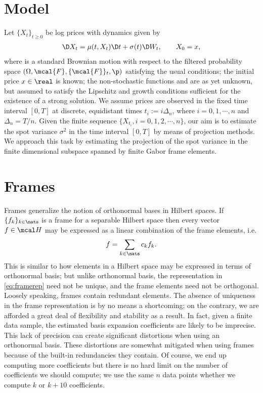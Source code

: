 \section{Model} \label{sec:model}
Let $\{X_t\}_{t\ge 0}$ be  log prices with dynamics given by  
\begin{align}
  \D X_t =   \mu(t, X_t) \D t + \sigma(t) \D W_t, \qquad X_0 = x,  
  \label{eq:pdynamics}
\end{align}
where \sbm is a standard Brownian motion with respect to the filtered probability space $(\Omega, \mcal{F}, \{\mcal{F}\}_t, \p)$ satisfying the usual conditions; the initial price $x \in \real$ is known; the non-stochastic functions \idp and \ivp are as yet unknown, but assumed to satisfy the Lipschitz and growth conditions sufficient for the existence of a strong solution. We assume prices are observed in the fixed time interval  $[0,T]$ at discrete, equidistant times $t_i := i\Delta_n$, where  $i= 0,1,\cdots,n$ and $\Delta_n = T/n$. Given the finite sequence  $\{X_{t_i}, i=0,1,2,\cdots,n\}$, our aim is to estimate the spot variance $\sigma^2$ in the time interval $[0,T]$ by means of projection methods. We approach this task  by estimating the projection  of the spot variance in  the finite dimensional subspace spanned by finite Gabor frame elements.  
\section{ Frames}\label{sec:gabor} 
Frames generalize the notion of orthonormal bases in  Hilbert spaces. If $\{f_k\}_{k \in \nats}$ is a frame for a separable Hilbert space \hs then every vector $f \in \hs$ may be expressed as a linear combination of the frame elements, i.e.
\begin{align}
  f = \sumn c_k f_k.
  \label{eq:framerep}
\end{align}
This is similar to how elements in a Hilbert space may be expressed in terms of orthonormal basis; but unlike orthonormal basis, the representation in \eqref{eq:framerep} need not be unique, and the frame elements need not be orthogonal. Loosely speaking, frames contain redundant elements. The absence of uniqueness in the frame representation is by no means a shortcoming; on the contrary, we are afforded a great deal of flexibility and stability as a result. In fact, given a finite data sample, the estimated basis expansion coefficients are likely to be imprecise. This lack of precision can create significant distortions when using an orthonormal basis. These distortions are somewhat mitigated when using frames because of the built-in redundancies  they contain. Of course, we end up computing more coefficients but there is no hard limit on the number of coefficients we should compute; we use the same $n$ data points whether we compute $k$ or $k+ 10$ coefficients.   



